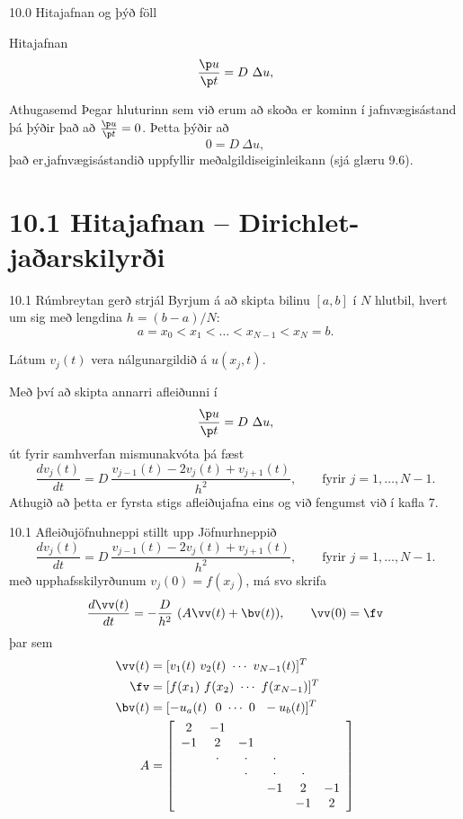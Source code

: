 \begin{frame}{10.0 Hitajafnan og þýð föll}
\begin{block}{Hitajafnan}
  $$
  \frac{\p u}{\p t} = D\  \Delta u,
 $$
 \end{block}
 
 \begin{block}{Athugasemd}
  Þegar hluturinn sem við erum að skoða er kominn í jafnvægisástand þá
  þýðir það að $\frac{\p u}{\p t} = 0$. \pause Þetta þýðir að 
  $$
     0 =  D\ \Delta u,
  $$
  það er,jafnvægisástandið uppfyllir meðalgildiseiginleikann (sjá glæru 9.6).
 \end{block}
 
\end{frame}

\section*{10.1 Hitajafnan --  Dirichlet-jaðarskilyrði }

\begin{frame}{10.1 Rúmbreytan gerð strjál }
 Byrjum á að skipta bilinu $[a,b]$ í $N$ hlutbil, hvert um sig með lengdina
 $h=(b-a)/N$:
 $$
    a = x_0 < x_1 < \ldots < x_{N-1} < x_N = b.
 $$ \pause
 
 Látum $v_j(t)$ vera nálgunargildið á $u(x_j,t)$.
 
 Með því að skipta annarri afleiðunni í 
 $$
 \frac{\p u}{\p t} =  D\ \Delta u,
 $$
 út fyrir samhverfan mismunakvóta þá fæst
 $$ 
 \frac{d v_j(t)}{d t} =  D\  \frac{v_{j-1}(t) -2 v_j(t) + v_{j+1}(t)}{h^2}, \qquad
 \text{fyrir } j=1,\ldots,N-1.
 $$
 Athugið að þetta er fyrsta stigs afleiðujafna eins og við fengumst við í kafla 7.
\end{frame}

\begin{frame}{10.1 Afleiðujöfnuhneppi stillt upp}
 Jöfnurhneppið 
 $$ 
 \frac{d v_j(t)}{d t} =  D\  \frac{v_{j-1}(t) -2 v_j(t) + v_{j+1}(t)}{h^2}, \qquad
 \text{fyrir } j=1,\ldots,N-1.
 $$ \pause
 með upphafsskilyrðunum $v_j(0) = f(x_j)$, \pause
 má svo skrifa
 $$ 
 \frac{d \vv(t)}{d t} =  -\frac{D}{h^2}\  (A\vv(t) + \bv(t)), \qquad \vv(0)=\fv
 $$
 þar sem 
 \begin{align*}
  \vv(t) &= [v_1(t) \ v_2(t) \ \cdots \ v_{N-1}(t) ]^T\\
  \fv &= [ f(x_1) \ f(x_2) \ \cdots \ f(x_{N-1}) ]^T\\
  \bv(t) &= [ -u_a(t) \ \ 0 \ \cdots \ 0 \ \ -u_b(t) ]^T \\
  A &=  \left[\begin{array}{cccccc}
2 & -1 &   &   &   &  \\
-1 & 2 & -1 &   &   &  \\
  & \cdot & \cdot & \cdot &   &  \\
  &   & \cdot & \cdot & \cdot &  \\
  &   &  & -1 & 2 & -1\\
  &   &   &   & -1 & 2
      \end{array}\right]
 \end{align*}
\end{frame}

